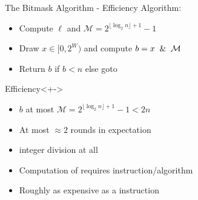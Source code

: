 \begin{frame}{The Bitmask Algorithm - Efficiency}
    Algorithm: \begin{itemize}
        \item[(1)] Compute $\ell$ and $\mathcal{M} = 2^{\lfloor\log_2n\rfloor + 1} - 1$
        \item[(2)] Draw $x \in [0,2^W)$ and compute $b = x \And \mathcal{M}$
        \item[(3)] Return $b$ if $b < n$ else goto \textbf{}
    \end{itemize}
    \pause 
    \smallskip
    \begin{block}{Efficiency}<+->
        \begin{itemize}[<+->]
            \item $b$ at most $\mathcal{M} = 2^{\lfloor\log_2n\rfloor + 1} - 1 < 2n$ 
            \item At most $\approx 2$ rounds in expectation
            \item {} integer division at all
            \item Computation of  requires  instruction/algorithm 
            \item Roughly as expensive as a  instruction 
        \end{itemize}
    \end{block}
\end{frame}
